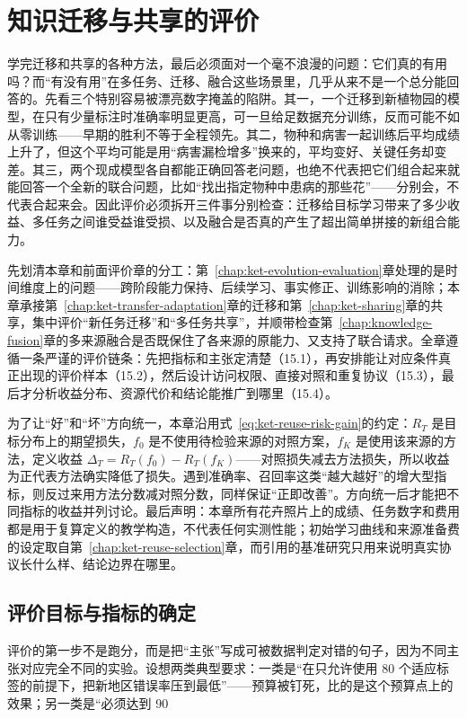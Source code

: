 \chapter{知识迁移与共享的评价}
\label{chap:ket-evaluation}

学完迁移和共享的各种方法，最后必须面对一个毫不浪漫的问题：它们真的有用吗？而“有没有用”在多任务、迁移、融合这些场景里，几乎从来不是一个总分能回答的。先看三个特别容易被漂亮数字掩盖的陷阱。其一，一个迁移到新植物园的模型，在只有少量标注时准确率明显更高，可一旦给足数据充分训练，反而可能不如从零训练——早期的胜利不等于全程领先。其二，物种和病害一起训练后平均成绩上升了，但这个平均可能是用“病害漏检增多”换来的，平均变好、关键任务却变差。其三，两个现成模型各自都能正确回答老问题，也绝不代表把它们组合起来就能回答一个全新的联合问题，比如“找出指定物种中患病的那些花”——分别会，不代表合起来会。因此评价必须拆开三件事分别检查：迁移给目标学习带来了多少收益、多任务之间谁受益谁受损、以及融合是否真的产生了超出简单拼接的新组合能力。

先划清本章和前面评价章的分工：第~\ref{chap:ket-evolution-evaluation}章处理的是时间维度上的问题——跨阶段能力保持、后续学习、事实修正、训练影响的消除；本章承接第~\ref{chap:ket-transfer-adaptation}章的迁移和第~\ref{chap:ket-sharing}章的共享，集中评价“新任务迁移”和“多任务共享”，并顺带检查第~\ref{chap:knowledge-fusion}章的多来源融合是否既保住了各来源的原能力、又支持了联合请求。全章遵循一条严谨的评价链条：先把指标和主张定清楚（15.1），再安排能让对应条件真正出现的评价样本（15.2），然后设计访问权限、直接对照和重复协议（15.3），最后才分析收益分布、资源代价和结论能推广到哪里（15.4）。

为了让“好”和“坏”方向统一，本章沿用式~\eqref{eq:ket-reuse-risk-gain}的约定：$R_T$ 是目标分布上的期望损失，$f_0$ 是不使用待检验来源的对照方案，$f_K$ 是使用该来源的方法，定义收益 $\Delta_T=R_T(f_0)-R_T(f_K)$——对照损失减去方法损失，所以收益为正代表方法确实降低了损失。遇到准确率、召回率这类“越大越好”的增大型指标，则反过来用方法分数减对照分数，同样保证“正即改善”。方向统一后才能把不同指标的收益并列讨论。最后声明：本章所有花卉照片上的成绩、任务数字和费用都是用于复算定义的教学构造，不代表任何实测性能；初始学习曲线和来源准备费的设定取自第~\ref{chap:ket-reuse-selection}章，而引用的基准研究只用来说明真实协议长什么样、结论边界在哪里。

\section{评价目标与指标的确定}
\label{sec:ket-evaluation-metrics}

评价的第一步不是跑分，而是把“主张”写成可被数据判定对错的句子，因为不同主张对应完全不同的实验。设想两类典型要求：一类是“在只允许使用 80 个适应标签的前提下，把新地区错误率压到最低”——预算被钉死，比的是这个预算点上的效果；另一类是“必须达到 90%

